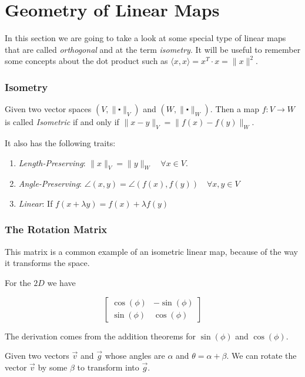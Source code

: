 \newpage
\chapter{Geometry of Linear Maps}

In this section we are going to take a look at some special type of linear maps that are called \emph{orthogonal} 
and at the term \emph{isometry}. It will be useful to remember some concepts about the dot product such as 
\(\langle x, x \rangle = x^T \cdot x = \|x\|^2\).

\subsection{Isometry}

Given two vector spaces \((V, \|\centerdot\|_V)\) and \((W, \|\centerdot\|_W)\). Then a map 
\(f: V \to W\) is called \emph{Isometric} if and only if \(\|x - y\|_V = \|f(x) - f(y)\|_W \).

It also has the following traits:

\begin{enumerate}
	\item \emph{Length-Preserving}: \(\|x\|_V = \|y\|_W \quad \forall x \in V\).
	\item \emph{Angle-Preserving}: \(\angle (x,y) = \angle (f(x),f(y)) \quad \forall x,y \in V\)
	\item \emph{Linear}: If \(f(x + \lambda y) = f(x) + \lambda f(y)\)
\end{enumerate}

\subsection{The Rotation Matrix}

This matrix is a common example of an isometric linear map, because of the way it transforms the space.

For the \(2D\) we have 

\[
    \begin{bmatrix}
        \cos(\phi) & -\sin(\phi)\\
        \sin(\phi) & \cos(\phi)
    \end{bmatrix}
\]

The derivation comes from the addition theorems for \(\sin(\phi) \) and \(\cos(\phi)\).

Given two vectors \(\vec{v}\) and \(\vec{g}\) whose angles are \(\alpha\) and \(\theta = \alpha + \beta\). 
We can rotate the vector \(\vec{v}\) by some \(\beta\) to transform into \(\vec{g}\).

